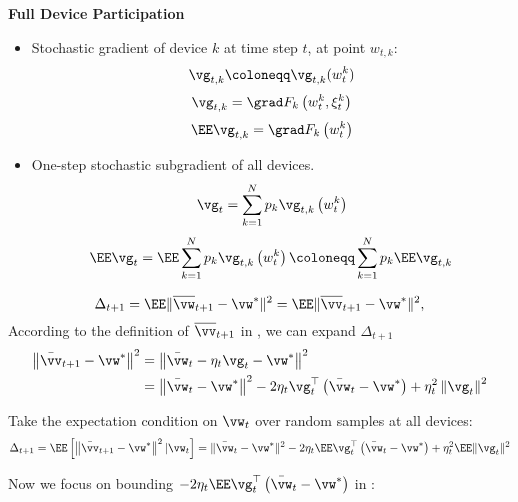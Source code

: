 

\textbf{Full Device Participation}

\begin{itemize}
	\item Stochastic gradient of device $k$ at time step $t$, at point $w_{t,k}$: 
	$$\vg_{t,k} \coloneqq \vg_{t,k}(w_t^k)$$
	$$ \vg_{t, k} = \grad F_{k}\left(w_{t}^{k}, \xi_{t}^{k}\right) $$
	$$\EE \vg_{t, k} = \grad F_{k}\left(w_{t}^{k}\right)$$
\item  One-step stochastic subgradient of all devices.
$$\vg_{t}=\sum_{k=1}^{N} p_{k} \vg_{t, k}\left(w_{t}^{k}\right) $$
\begin{align}
	\EE \vg_{t}= \EE \sum_{k=1}^{N} p_{k} \vg_{t, k}\left(w_{t}^{k}\right) \coloneqq \sum_{k=1}^{N} p_{k} \EE \vg_{t, k}
	\label{eq:egtsgd}
\end{align}
\end{itemize}



$$\Delta_{t+1} = \EE \|\overline{\vw}_{t+1} - \vw^*\|^2 = \EE \|\overline{\vv}_{t+1} - \vw^*\|^2,$$
According to the definition of $\overline{\vv}_{t+1}$ in \eq{\ref{eq:vbar}}, we can expand $\Delta_{t+1}$
$$\begin{aligned}\left\|\bar{\vv}_{t+1}-\vw^{*}\right\|^2 &=\left\|\bar{\vw}_{t}-\eta_{t} \vg_{t}-\vw^{*}\right\|^2 \\ &=\left\|\bar{\vw}_{t}-\vw^{*}\right\|^{2}-2 \eta_{t} \vg_{t}^{\top}\left(\bar{\vw}_{t}-\vw^{*}\right)+\eta_{t}^{2}\left\|\vg_{t}\right\|^{2} \end{aligned}$$

Take the expectation condition on $\vw_t$ over random samples at all devices:
\begin{align}
\Delta_{t+1} = \EE\left[\left\|\bar{\vv}_{t+1}-\vw^{*}\right\|^2| \vw_{t}\right]=\|\bar{\vw}_{t}-\vw^{*}\|^{2}-2 \eta_{t} \EE \vg_{t}^{\top}\left(\bar{\vw}_{t}-\vw^{*}\right)+\eta_{t}^{2} \EE\| \vg_{t} \|^{2}	
\label{eq:expandsgd}
\end{align}

Now we focus on bounding $-2 \eta_{t} \EE \vg_{t}^{\top}\left(\bar{\vw}_{t}-\vw^{*}\right)$ in \eq{\ref{eq:expandsgd}}: 
